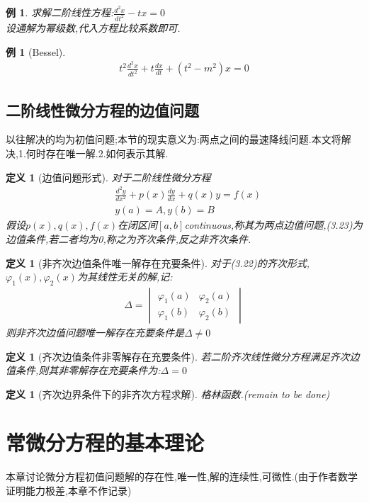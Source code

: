\documentclass[12pt, a4paper, oneside]{ctexbook}
\newtheorem{definition}[theorem]{定义}
\newtheorem{example}[theorem]{例}
\begin{document}
    \begin{example}
        求解二阶线性方程:$ \frac{d^2x}{dt^2}-tx=0 $\\
        设通解为幂级数,代入方程比较系数即可.
    \end{example}
    \begin{example}[Bessel]
        \begin{align}
            t^2\frac{d^2x}{dt^2}+t\frac{dx}{dt}+(t^2-m^2)x=0
        \end{align}
    \end{example}
    \section{二阶线性微分方程的边值问题}
    以往解决的均为初值问题;本节的现实意义为:两点之间的最速降线问题.本文将解决,1.何时存在唯一解.2.如何表示其解.
    \begin{definition}[边值问题形式]
        对于二阶线性微分方程
        \begin{align}
            &\frac{d^2y}{dx^2}+p(x)\frac{dy}{dx}+q(x)y=f(x)\\
            &y(a)=A,y(b)=B
        \end{align}
        假设$p(x),q(x),f(x) $在闭区间$[a,b]$continuous,称其为两点边值问题,(3.23)为边值条件,若二者均为0,称之为齐次条件,反之非齐次条件.
    \end{definition}
    \begin{definition}[非齐次边值条件唯一解存在充要条件]
            对于(3.22)的齐次形式,$ \varphi_1(x),\varphi_2(x) $为其线性无关的解,记:
        \begin{align}
            \Delta=\begin{vmatrix}
                \varphi_1(a)&\varphi_2(a)\\\varphi_1(b)&\varphi_2(b)
            \end{vmatrix}
        \end{align}
        则非齐次边值问题唯一解存在充要条件是$\Delta \neq 0$

    \end{definition}
    \begin{definition}[齐次边值条件非零解存在充要条件]
        若二阶齐次线性微分方程满足齐次边值条件,则其非零解存在充要条件为:$ \Delta=0$
    \end{definition}
    \begin{definition}[齐次边界条件下的非齐次方程求解]
        格林函数.(remain to be done)
    \end{definition}
\chapter{常微分方程的基本理论}
    本章讨论微分方程初值问题解的存在性,唯一性,解的连续性,可微性.(由于作者数学证明能力极差,本章不作记录)
\end{document}
